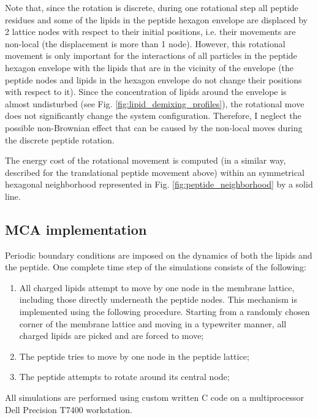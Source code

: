 Note that, since the rotation is discrete, during one rotational step all peptide residues and some of the lipids in the peptide hexagon envelope are displaced by 2 lattice nodes with respect to their initial positions, i.e. their movements are non-local (the displacement is more than 1 node). However, this rotational movement is only important for the interactions of all particles in the peptide hexagon envelope with the lipids that are in the vicinity of the envelope (the peptide nodes and lipids in the hexagon envelope do not change their positions with respect to it). Since the concentration of lipids around the envelope is almost undisturbed (see Fig. \ref{fig:lipid_demixing_profiles}), the rotational move does not significantly change the system configuration. Therefore, I neglect the possible non-Brownian effect that can be caused by the non-local moves during the discrete peptide rotation.

The energy cost of the rotational movement is computed (in a similar way, described for the translational peptide movement above) within an symmetrical hexagonal neighborhood represented in Fig. \ref{fig:peptide_neighborhood} by a solid line.


\subsection{MCA implementation}

\label{model_implementation}

Periodic boundary conditions are imposed on the dynamics of both the lipids and the peptide. One complete time step of the simulations consists of the following:
\begin{enumerate}
 \item All charged lipids attempt to move by one node in the membrane lattice, including those directly underneath the peptide nodes. This mechanism is implemented using the following procedure. Starting from a randomly chosen corner of the membrane lattice and moving in a typewriter manner, all charged lipids are picked and are forced to move;
 \item \label{2} The peptide tries to move by one node in the peptide lattice;
 \item \label{3} The peptide attempts to rotate around its central node;
\end{enumerate}

All simulations are performed using custom written C code on a multiprocessor Dell Precision T7400 workstation.

